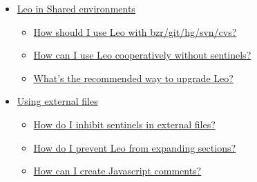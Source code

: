 \documentclass[a4paper,10pt,english]{sphinxmanual}
\begin{document}
{\begin{minipage}{0.95\linewidth}
\begin{itemize}
\begin{itemize}
\begin{itemize}
\item {} 
{\hyperref[FAQ:when-is-using-a-section-better-than-using-a-method]{When is using a section better than using a method?}}

\item {} 
{\hyperref[FAQ:when-is-deleting-a-node-dangerous]{When is deleting a node dangerous?}}

\item {} 
{\hyperref[FAQ:why-doesn-t-leo-support-cross-file-clones]{Why doesn't Leo support cross-file clones?}}

\item {} 
{\hyperref[FAQ:how-does-ekr-leo-s-developer-use-leo]{How does EKR (Leo's developer) use Leo?}}

\item {} 
{\hyperref[FAQ:how-does-leo-handle-clone-conflicts]{How does Leo handle clone conflicts?}}

\end{itemize}

\item {} 
{\hyperref[FAQ:leo-in-shared-environments]{Leo in Shared environments}}
\begin{itemize}
\item {} 
{\hyperref[FAQ:how-should-i-use-leo-with-bzr-git-hg-svn-cvs]{How should I use Leo with bzr/git/hg/svn/cvs?}}

\item {} 
{\hyperref[FAQ:how-can-i-use-leo-cooperatively-without-sentinels]{How can I use Leo cooperatively without sentinels?}}

\item {} 
{\hyperref[FAQ:what-s-the-recommended-way-to-upgrade-leo]{What's the recommended way to upgrade Leo?}}

\end{itemize}

\item {} 
{\hyperref[FAQ:using-external-files]{Using external files}}
\begin{itemize}
\item {} 
{\hyperref[FAQ:how-do-i-inhibit-sentinels-in-external-files]{How do I inhibit sentinels in external files?}}

\item {} 
{\hyperref[FAQ:how-do-i-prevent-leo-from-expanding-sections]{How do I prevent Leo from expanding sections?}}

\item {} 
{\hyperref[FAQ:how-can-i-create-javascript-comments]{How can I create Javascript comments?}}


\end{itemize}
\end{itemize}
\end{itemize}
\end{minipage}}
\end{document}
